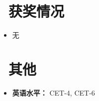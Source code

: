 \documentclass[11pt]{article}
\begin{document}
\section{\makebox[\widthof{\faGraduationCap}][c]{\color{CVBlue}\faList}\ 获奖情况}
\begin{itemize}
    \item 无
    
\end{itemize}
    
\section{\makebox[\widthof{\faInfo}][c]{\color{CVBlue}\faInfo}\ 其他}
\begin{itemize}[parsep=0.5ex]
    \item \textbf{英语水平：} CET-4, CET-6
\end{itemize}
\end{document}
